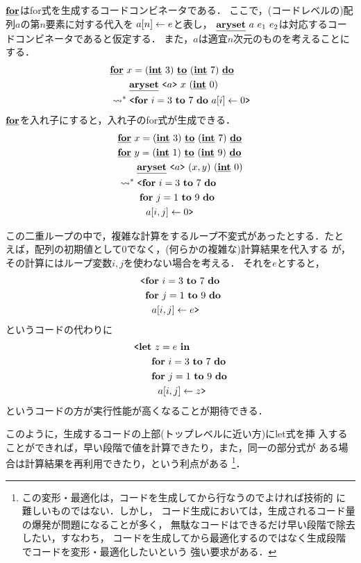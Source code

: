 $\underline{\textbf{for}}$はfor式を生成するコードコンビネータである．
ここで，(コードレベルの)配列$a$の第$n$要素に対する代入を
${a}[{n}]\leftarrow {e}$と表し，
$\underline{\textbf{aryset}}~{a}~{e_1}~{e_2}$は対応するコードコンビネータであると仮定する．
また，$a$は適宜$n$次元のものを考えることにする．
\begin{align*}
  & \underline{\textbf{for}}~{x=(\underline{\textbf{int}}~3)}~\underline{\textbf{to}}~{(\underline{\textbf{int}}~7)}~\underline{\textbf{do}} \\
  & \qquad \underline{\textbf{aryset}}~{\texttt{<}{a}\texttt{>}}~{x}~{(\underline{\textbf{int}}~0)} \\
  & \leadsto^* \texttt{<}{\textbf{for}~{i=3}~\textbf{to}~{7}~\textbf{do}~{a}[{i}]\leftarrow {0}}\texttt{>}
\end{align*}
$\underline{\textbf{for}}$を入れ子にすると，入れ子のfor式が生成できる．
\begin{align*}
  & \cforin{x=(\cint~3)}{(\cint~7)} \\
  & \cforin{y=(\cint~1)}{(\cint~9)} \\
  & \qquad \caryset{\code{a}}{(x,y)}{(\cint~0)} \\
  & \too \codebegin \forin{i=3}{7} \\
  & \phantom{\too \codebegin} \forin{j=1}{9} \\
  & \phantom{\too \codebegin} ~~\aryset{a}{i,j}{0} \codeend
\end{align*}

この二重ループの中で，複雑な計算をするループ不変式があったとする．たと
えば，配列の初期値として$0$でなく，(何らかの複雑な)計算結果を代入する
が，その計算にはループ変数$i,j$を使わない場合を考える．
それを$e$とすると，
\begin{align*}
  & \codebegin \forin{i=3}{7} \\
  & \phantom{\codebegin} \forin{j=1}{9} \\
  & \phantom{\codebegin} ~~\aryset{a}{i,j}{e} \codeend
\end{align*}
というコードの代わりに
\begin{align*}
  & \codebegin \Let~z=e~\In \\
  & \phantom{\codebegin \Let} \forin{i=3}{7} \\
  & \phantom{\codebegin \Let} \forin{j=1}{9} \\
  & \phantom{\codebegin \Let} ~~\aryset{a}{i,j}{z} \codeend
\end{align*}
というコードの方が実行性能が高くなることが期待できる．

このように，生成するコードの上部(トップレベルに近い方)にlet式を挿
入することができれば，早い段階で値を計算できたり，また，同一の部分式が
ある場合は計算結果を再利用できたり，という利点がある%
\footnote{この変形・最適化は，コードを生成してから行なうのでよければ技術的
  に難しいものではない．しかし，
  コード生成においては，生成されるコード量の爆発が問題になることが多く，
  無駄なコードはできるだけ早い段階で除去したい，すなわち，
  コードを生成してから最適化するのではなく生成段階でコードを変形・最適化したいという
  強い要求がある．}．

